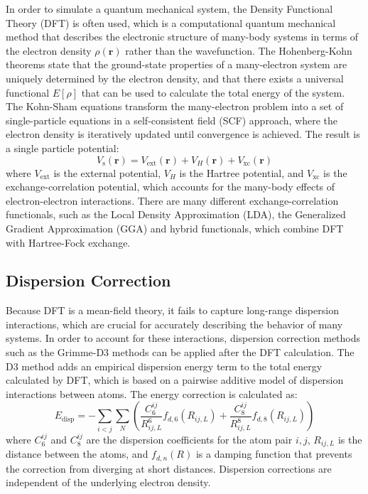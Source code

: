 In order to simulate a quantum mechanical system, the Density Functional Theory (DFT) is often used, which is a computational quantum mechanical method that describes the electronic structure of many-body systems in terms of the electron density \(\rho(\textbf{r})\) rather than the wavefunction.
The Hohenberg-Kohn theorems state that the ground-state properties of a many-electron system are uniquely determined by the electron density, and that there exists a universal functional \(E[\rho]\) that can be used to calculate the total energy of the system.
The Kohn-Sham equations transform the many-electron problem into a set of single-particle equations in a self-consistent field (SCF) approach, where the electron density is iteratively updated until convergence is achieved.
The result is a single particle potential:
\begin{equation}
    V_{\text{s}} (\mathbf{r}) = V_{\text{ext}} (\textbf{r}) + V_H (\textbf{r}) + V_{\text{xc}} (\textbf{r})
\end{equation}
where \(V_{\text{ext}}\) is the external potential, \(V_H\) is the Hartree potential, and \(V_{\text{xc}}\) is the exchange-correlation potential, which accounts for the many-body effects of electron-electron interactions.
There are many different exchange-correlation functionals, such as the Local Density Approximation (LDA), the Generalized Gradient Approximation (GGA) and hybrid functionals, which combine DFT with Hartree-Fock exchange.

\subsection{Dispersion Correction}
Because DFT is a mean-field theory, it fails to capture long-range dispersion interactions, which are crucial for accurately describing the behavior of many systems. In order to account for these interactions, dispersion correction methods such as the Grimme-D3 methods can be applied after the DFT calculation. The D3 method adds an empirical dispersion energy term to the total energy calculated by DFT, which is based on a pairwise additive model of dispersion interactions between atoms.
The energy correction is calculated as:
\begin{equation}
    E_{\text{disp}} = -\sum_{i<j} \sum_{N} \left(\frac{C_6^{ij}}{R^6_{ij, L}}f_{d, 6}(R_{ij, L}) + \frac{C_8^{ij}}{R^8_{ij, L}}f_{d, 8}(R_{ij, L})\right)
\end{equation}
where \(C_6^{ij}\) and \(C_8^{ij}\) are the dispersion coefficients for the atom pair \(i,j\), \(R_{ij, L}\) is the distance between the atoms, and \(f_{d, n}(R)\) is a damping function that prevents the correction from diverging at short distances.
Dispersion corrections are independent of the underlying electron density.

